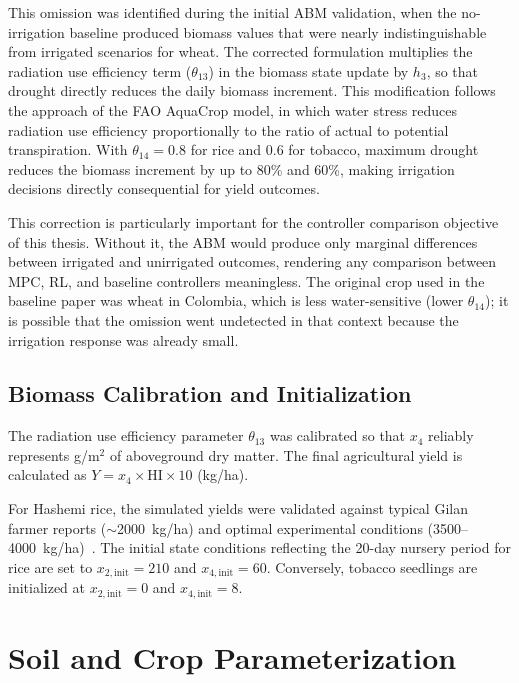 This omission was identified during the initial ABM validation, when the no-irrigation baseline produced biomass values that were nearly indistinguishable from irrigated scenarios for wheat. The corrected formulation multiplies the radiation use efficiency term ($\theta_{13}$) in the biomass state update by $h_3$, so that drought directly reduces the daily biomass increment. This modification follows the approach of the FAO AquaCrop model, in which water stress reduces radiation use efficiency proportionally to the ratio of actual to potential transpiration. With $\theta_{14} = 0.8$ for rice and 0.6 for tobacco, maximum drought reduces the biomass increment by up to 80\% and 60\%, making irrigation decisions directly consequential for yield outcomes.

This correction is particularly important for the controller comparison objective of this thesis. Without it, the ABM would produce only marginal differences between irrigated and unirrigated outcomes, rendering any comparison between MPC, RL, and baseline controllers meaningless. The original crop used in the baseline paper was wheat in Colombia, which is less water-sensitive (lower $\theta_{14}$); it is possible that the omission went undetected in that context because the irrigation response was already small.

\subsection{Biomass Calibration and Initialization}

The radiation use efficiency parameter $\theta_{13}$ was calibrated so that $x_4$ reliably represents g/m$^2$ of aboveground dry matter. The final agricultural yield is calculated as $Y = x_4 \times \text{HI} \times 10$ (kg/ha). 

For Hashemi rice, the simulated yields were validated against typical Gilan farmer reports ($\sim$2000~kg/ha) and optimal experimental conditions (3500--4000~kg/ha)~\cite{jalali2021}. The initial state conditions reflecting the 20-day nursery period for rice are set to $x_{2,\text{init}} = 210$ and $x_{4,\text{init}} = 60$. Conversely, tobacco seedlings are initialized at $x_{2,\text{init}} = 0$ and $x_{4,\text{init}} = 8$.

\section{Soil and Crop Parameterization}
\label{sec:soil_crop_params}

